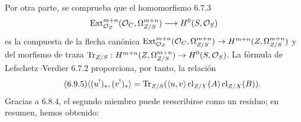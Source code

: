 Por otra parte, se comprueba que el homomorfismo 6.7.3
\[
\operatorname{Ext}^{m+n}_{\mathcal{O}_Z}(\mathcal{O}_C,\Omega^{m+n}_{Z/S})\longrightarrow H^0(S,\mathcal{O}_S)
\]
es la compuesta de la flecha canónica $\operatorname{Ext}^{m+n}_{\mathcal{O}_Z}(\mathcal{O}_C,\Omega^{m+n}_{Z/S})\to H^{m+n}(Z,\Omega^{m+n}_{Z/S})$ y del morfismo de traza $\operatorname{Tr}_{Z/S}:H^{m+n}(Z,\Omega^{m+n}_{Z/S})\to H^0(S,\mathcal{O}_S)$. La fórmula de Lefschetz--Verdier 6.7.2 proporciona, por tanto, la relación
\begin{equation}
\tag{6.9.5}
\langle (u^!)_*,(v^!)_*\rangle=\operatorname{Tr}_{Z/S}(\langle u,v\rangle\operatorname{cl}_{Z/Y}(A)\operatorname{cl}_{Z/X}(B)).
\end{equation}
Gracias a 6.8.4, el segundo miembro puede reescribirse como un residuo; en resumen, hemos obtenido:


